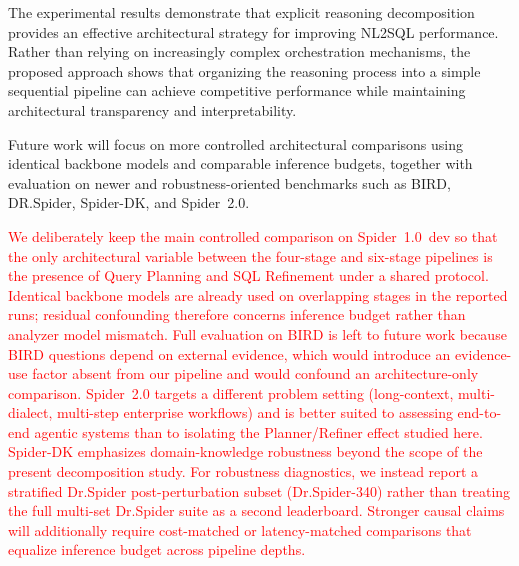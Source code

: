 \documentclass{svproc}
\begin{document}
The experimental results demonstrate that explicit reasoning decomposition provides an effective architectural strategy for improving NL2SQL performance. Rather than relying on increasingly complex orchestration mechanisms, the proposed approach shows that organizing the reasoning process into a simple sequential pipeline can achieve competitive performance while maintaining architectural transparency and interpretability.


Future work will focus on more controlled architectural comparisons using identical backbone models and comparable inference budgets, together with evaluation on newer and robustness-oriented benchmarks such as BIRD, DR.Spider, Spider-DK, and Spider~2.0.

\textcolor{red}{%
We deliberately keep the main controlled comparison on Spider~1.0~dev so that the only architectural variable between the four-stage and six-stage pipelines is the presence of Query Planning and SQL Refinement under a shared protocol.
Identical backbone models are already used on overlapping stages in the reported runs; residual confounding therefore concerns inference budget rather than analyzer model mismatch.
Full evaluation on BIRD is left to future work because BIRD questions depend on external evidence, which would introduce an evidence-use factor absent from our pipeline and would confound an architecture-only comparison.
Spider~2.0 targets a different problem setting (long-context, multi-dialect, multi-step enterprise workflows) and is better suited to assessing end-to-end agentic systems than to isolating the Planner/Refiner effect studied here.
Spider-DK emphasizes domain-knowledge robustness beyond the scope of the present decomposition study.
For robustness diagnostics, we instead report a stratified Dr.Spider post-perturbation subset (Dr.Spider-340) rather than treating the full multi-set Dr.Spider suite as a second leaderboard.
Stronger causal claims will additionally require cost-matched or latency-matched comparisons that equalize inference budget across pipeline depths.
}%


\end{document}
